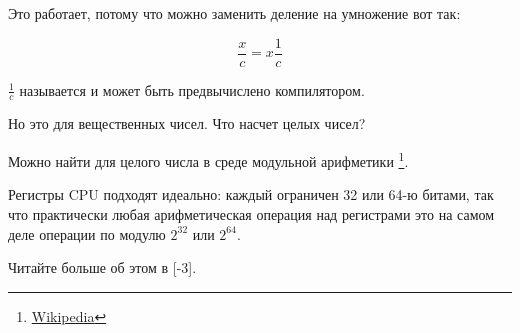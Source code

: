 Это работает, потому что можно заменить деление на умножение вот так:

\[
	\frac{x}{c} = x\frac{1}{c}
\]


$\frac{1}{c}$ называется  и может быть предвычислено компилятором.

Но это для вещественных чисел.
Что насчет целых чисел?

Можно найти  для целого числа в среде модульной арифметики
\footnote{\href{http://go.yurichev.com/17359}{Wikipedia}}.

Регистры \ac{CPU} подходят идеально: каждый ограничен 32 или 64-ю битами, так что практически любая арифметическая операция над регистрами это на самом деле операции по модулю $2^{32}$ или $2^{64}$.

Читайте больше об этом в [-3].

